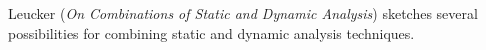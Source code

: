 

Leucker
\cite{isola-2016-leucker}
({\em On Combinations of Static and Dynamic Analysis})
sketches several possibilities for combining static and dynamic
analysis techniques.
